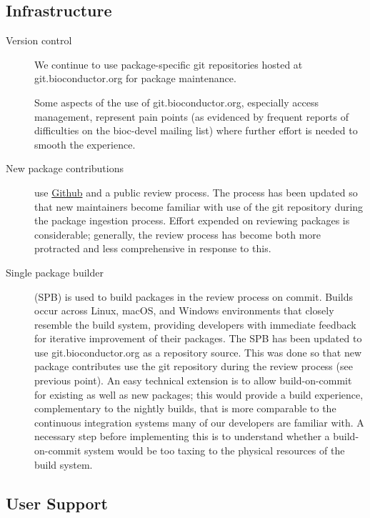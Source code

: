 \documentclass[letterpaper]{article}
\begin{document}
\subsection{Infrastructure}

\begin{description}
\item[Version control] We continue to use package-specific git
  repositories hosted at git.bioconductor.org for package
  maintenance.

  Some aspects of the use of git.bioconductor.org, especially access
  management, represent pain points (as evidenced by frequent reports
  of difficulties on the bioc-devel mailing list) where further effort
  is needed to smooth the experience.
\item[New package contributions] use
  \href{https://github.com/Bioconductor/Contributions}{Github} and a
  public review process. The process has been updated so that new
  maintainers become familiar with use of the \Bioconductor{} git
  repository during the package ingestion process. Effort expended on
  reviewing packages is considerable; generally, the review process
  has become both more protracted and less comprehensive in response
  to this.
\item[Single package builder] (SPB) is used to build packages in the
  review process on commit. Builds occur across Linux, macOS, and
  Windows environments that closely resemble the \Bioconductor{} build
  system, providing developers with immediate feedback for iterative
  improvement of their packages. The SPB has been updated to use
  git.bioconductor.org as a repository source. This was done so that
  new package contributes use the \Bioconductor{} git repository
  during the review process (see previous point). An easy technical
  extension is to allow build-on-commit for existing as well as new
  packages; this would provide a build experience, complementary to
  the nightly builds, that is more comparable to the continuous
  integration systems many of our developers are familiar with. A
  necessary step before implementing this is to understand whether a
  build-on-commit system would be too taxing to the physical resources
  of the build system.
\end{description}

\subsection{User Support}
\end{document}

